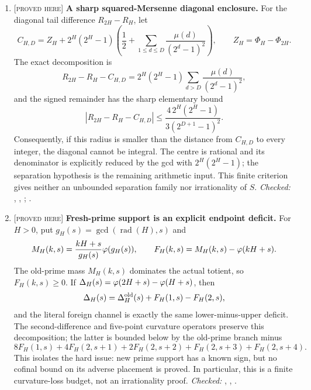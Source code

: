 \documentclass[11pt]{article}
\newcommand{\Stot}{S}
\newcommand{\stag}[1]{{\normalfont\footnotesize\textsc{[#1]}}}
\begin{document}
{\begin{enumerate}[label=\textbf{R\arabic*.},ref=R\arabic*,leftmargin=2.4em,
  itemsep=0.2em,topsep=0.25em]
\item\label{res:squareenclosure} \stag{proved here}
\textbf{A sharp squared-Mersenne diagonal enclosure.}  For the diagonal
tail difference \(R_{2H}-R_H\), let
\[
 C_{H,D}=Z_H+2^H(2^H-1)\left(\frac12+
   \sum_{1\le d\le D}\frac{\mu(d)}{(2^d-1)^2}\right),
 \qquad Z_H=\Phi_H-\Phi_{2H}.
\]
The exact decomposition is
\[
 R_{2H}-R_H-C_{H,D}
 =2^H(2^H-1)\sum_{d>D}\frac{\mu(d)}{(2^d-1)^2},
\]
and the signed remainder has the sharp elementary bound
\[
 \left|R_{2H}-R_H-C_{H,D}\right|
 \le \frac{4\,2^H(2^H-1)}{3(2^{D+1}-1)^2}.
\]
Consequently, if this radius is smaller than the distance from \(C_{H,D}\)
to every integer, the diagonal cannot be integral.  The centre is rational
and its denominator is explicitly reduced by the gcd with \(2^H(2^H-1)\);
the separation hypothesis is the remaining arithmetic input.  This finite
criterion gives neither an unbounded separation family nor irrationality of
\(\Stot\).
{\footnotesize\emph{Checked:}
,
,
;
.}

\item\label{res:freshprimedeficit} \stag{proved here}
\textbf{Fresh-prime support is an explicit endpoint deficit.}  For \(H>0\),
put \(g_H(s)=\gcd(\operatorname{rad}(H),s)\) and
\[
 M_H(k,s)=\frac{kH+s}{g_H(s)}\varphi(g_H(s)),
 \qquad F_H(k,s)=M_H(k,s)-\varphi(kH+s).
\]
The old-prime mass \(M_H(k,s)\) dominates the actual totient, so
\(F_H(k,s)\ge0\).  If \(\Delta_H(s)=\varphi(2H+s)-\varphi(H+s)\), then
\[
 \Delta_H(s)=\Delta_H^{\rm old}(s)+F_H(1,s)-F_H(2,s),
\]
and the literal foreign channel is exactly the same lower-minus-upper
deficit.  The second-difference and five-point curvature operators preserve
this decomposition; the latter is bounded below by the old-prime branch
minus
\[
 8F_H(1,s)+4F_H(2,s+1)+2F_H(2,s+2)+F_H(2,s+3)+F_H(2,s+4).
\]
This isolates the hard issue: new prime support has a known sign, but no
cofinal bound on its adverse placement is proved.  In particular, this is a
finite curvature-loss budget, not an irrationality proof.
{\footnotesize\emph{Checked:}
,
,
.}


\end{enumerate}}
\end{document}
